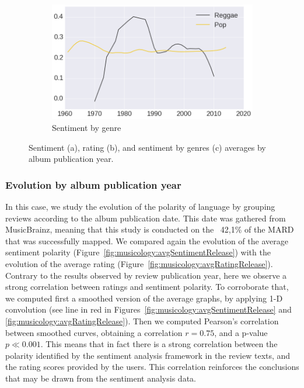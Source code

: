 \begin{figure}
    \begin{subfigure}{.49\textwidth}
        \centering
        \includegraphics[width=\columnwidth]{ch05_musicology_pics/genres_release_trend.png}
        \caption{Sentiment by genre}
        \label{fig:musicology:avgSentimentGenresRelease}
    \end{subfigure}
    \caption{Sentiment (a), rating (b), and sentiment by genres (c) averages by album publication year.}
\end{figure}

\subsubsection{Evolution by album publication year}
\label{sec:musicology:evolution-album}

In this case, we study the evolution of the polarity of language by grouping reviews according to the album publication date. This date was gathered from MusicBrainz, meaning that this study is conducted on the ~42,1\% of the MARD that was successfully mapped. We compared again the evolution of the average sentiment polarity (Figure~\ref{fig:musicology:avgSentimentRelease}) with the evolution of the average rating (Figure~\ref{fig:musicology:avgRatingRelease}). Contrary to the results observed by review publication year, here we observe a strong correlation between ratings and sentiment polarity. To corroborate that, we computed first a smoothed version of the average graphs, by applying 1-D convolution (see line in red in Figures~\ref{fig:musicology:avgSentimentRelease} and \ref{fig:musicology:avgRatingRelease}). Then we computed Pearson's correlation between smoothed curves, obtaining a correlation $r = 0.75$, and a p-value $p \ll 0.001$. This means that in fact there is a strong correlation between the polarity identified by the sentiment analysis framework in the review texts, and the rating scores provided by the users. This correlation reinforces the conclusions that may be drawn from the sentiment analysis data. %

